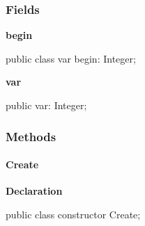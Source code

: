 \documentclass{report}
\newif\ifpdf
\begin{document}
\subsubsection*{\large{\textbf{Fields}}\normalsize\hspace{1ex}\hfill}
\begin{list}{}{
\setlength{\itemindent}{0cm}
\setlength{\listparindent}{0cm}
\setlength{\leftmargin}{\evensidemargin}
\addtolength{\leftmargin}{\tmplength}
\settowidth{\labelsep}{X}
\addtolength{\leftmargin}{\labelsep}
\setlength{\labelwidth}{\tmplength}
}
\label{ok_prefix_identifier.TTest-begin}
\item[\textbf{begin}\hfill]
\ifpdf
\begin{flushleft}
\fi
\begin{ttfamily}
public class var begin: Integer;\end{ttfamily}

\ifpdf
\end{flushleft}
\fi


\par  \label{ok_prefix_identifier.TTest-var}
\item[\textbf{var}\hfill]
\ifpdf
\begin{flushleft}
\fi
\begin{ttfamily}
public var: Integer;\end{ttfamily}

\ifpdf
\end{flushleft}
\fi


\par  \end{list}
\subsubsection*{\large{\textbf{Methods}}\normalsize\hspace{1ex}\hfill}
\paragraph*{Create}\hspace*{\fill}

\label{ok_prefix_identifier.TTest-Create}
\begin{list}{}{
\setlength{\itemindent}{0cm}
\setlength{\listparindent}{0cm}
\setlength{\leftmargin}{\evensidemargin}
\addtolength{\leftmargin}{\tmplength}
\settowidth{\labelsep}{X}
\addtolength{\leftmargin}{\labelsep}
\setlength{\labelwidth}{\tmplength}
}
\item[\textbf{Declaration}\hfill]
\ifpdf
\begin{flushleft}
\fi
\begin{ttfamily}
public class constructor Create;\end{ttfamily}

\ifpdf
\end{flushleft}
\fi

\end{list}
\end{document}
